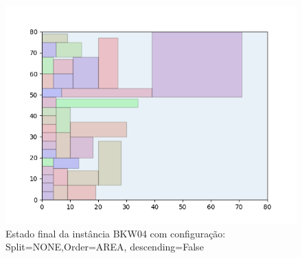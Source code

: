\begin{figure}[H]
    \centering
    \caption[]{Estado final da instância BKW04 com configuração: Split=NONE,Order=AREA, descending=False}
    \label{fig:bkw04-none-area-false}
    \includegraphics[scale=0.5]{output/figures/bkw/bkw04/none/area/false/00}
\end{figure}